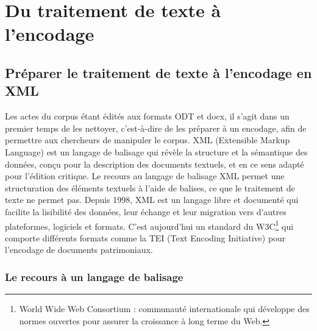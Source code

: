 \part{Du traitement de texte à l'encodage} 

\chapter[Préparation à l'encodage]{Préparer le traitement de texte à l'encodage en XML}

\par Les actes du corpus étant édités aux formats ODT et docx, il s’agit dans un premier temps de les nettoyer, c’est-à-dire de les préparer à un encodage, afin de permettre aux chercheurs de manipuler le corpus. XML (Extensible Markup Language) est un langage de balisage qui révèle la structure et la sémantique des données, conçu pour la description des documents textuels, et en ce sens adapté pour l'édition critique. Le recours au langage de balisage XML permet une structuration des éléments textuels à l'aide de balises, ce que le traitement de texte ne permet pas. Depuis 1998, XML est un langage libre et documenté qui facilite la lisibilité des données, leur échange et leur migration vers d’autres plateformes, logiciels et formats. C'est aujourd'hui un standard du W3C\footnote{World Wide Web Consortium : communauté internationale qui développe des normes ouvertes pour assurer la croissance à long terme du Web.} qui comporte différents formats comme la TEI (Text Encoding Initiative) pour l'encodage de documents patrimoniaux.
\newpage 

\section{Le recours à un langage de balisage}
\label{II.3.1}

